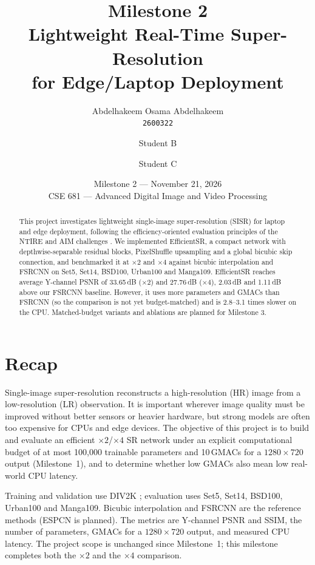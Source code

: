 \documentclass[11pt]{article}
\title{
    \LARGE Milestone 2\\[6pt]
    \large Lightweight Real-Time Super-Resolution\\
    \large for Edge/Laptop Deployment
}
\author{
    Abdelhakeem Osama Abdelhakeem \\ \texttt{2600322}
    \and
    Student B \\ \texttt{}
    \and
    Student C \\ \texttt{}
}
\date{
    Milestone 2 --- November 21, 2026\\{}
    CSE 681 --- Advanced Digital Image and Video Processing
}
\begin{document}
\maketitle

\begin{abstract}
This project investigates lightweight single-image super-resolution (SISR) for laptop and edge deployment, following the efficiency-oriented evaluation principles of the NTIRE and AIM challenges \citep{ren2025ntire,aim2025}. We implemented EfficientSR, a compact network with depthwise-separable residual blocks, PixelShuffle upsampling and a global bicubic skip connection, and benchmarked it at $\times2$ and $\times4$ against bicubic interpolation and FSRCNN \citep{dong2016fsrcnn} on Set5, Set14, BSD100, Urban100 and Manga109. EfficientSR reaches average Y-channel PSNR of 33.65\,dB ($\times2$) and 27.76\,dB ($\times4$), 2.03\,dB and 1.11\,dB above our FSRCNN baseline. However, it uses more parameters and GMACs than FSRCNN (so the comparison is not yet budget-matched) and is 2.8--3.1 times slower on the CPU. Matched-budget variants and ablations are planned for Milestone 3.
\end{abstract}

\section{Recap}
\label{sec:recap}
Single-image super-resolution reconstructs a high-resolution (HR) image from a low-resolution (LR) observation. It is important wherever image quality must be improved without better sensors or heavier hardware, but strong models are often too expensive for CPUs and edge devices. The objective of this project is to build and evaluate an efficient $\times2$/$\times4$ SR network under an explicit computational budget of at most 100{,}000 trainable parameters and 10\,GMACs for a $1280\times720$ output (Milestone~1), and to determine whether low GMACs also mean low real-world CPU latency.

Training and validation use DIV2K \citep{agustsson2017div2k}; evaluation uses Set5, Set14, BSD100, Urban100 and Manga109. Bicubic interpolation and FSRCNN \citep{dong2016fsrcnn} are the reference methods (ESPCN \citep{shi2016espcn} is planned). The metrics are Y-channel PSNR and SSIM, the number of parameters, GMACs for a $1280\times720$ output, and measured CPU latency. The project scope is unchanged since Milestone~1; this milestone completes both the $\times2$ and the $\times4$ comparison.
\end{document}
